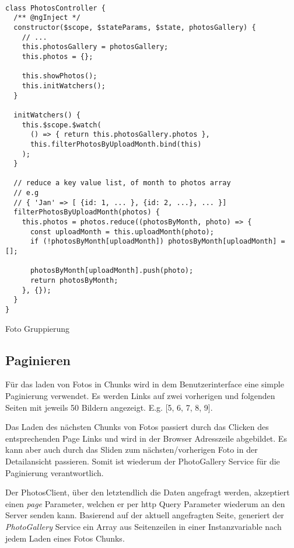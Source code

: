 \begin{listing}[H]
\begin{verbatim}

class PhotosController {
  /** @ngInject */
  constructor($scope, $stateParams, $state, photosGallery) {
    // ...
    this.photosGallery = photosGallery;
    this.photos = {};

    this.showPhotos();
    this.initWatchers();
  }

  initWatchers() {
    this.$scope.$watch(
      () => { return this.photosGallery.photos }, 
      this.filterPhotosByUploadMonth.bind(this)
    );
  }

  // reduce a key value list, of month to photos array
  // e.g
  // { 'Jan' => [ {id: 1, ... }, {id: 2, ...}, ... }]
  filterPhotosByUploadMonth(photos) {
    this.photos = photos.reduce((photosByMonth, photo) => {
      const uploadMonth = this.uploadMonth(photo);
      if (!photosByMonth[uploadMonth]) photosByMonth[uploadMonth] = [];

      photosByMonth[uploadMonth].push(photo);
      return photosByMonth;
    }, {});
  }
}

\end{verbatim}
\caption{Foto Gruppierung}
\label{lst:photo_group}
\end{listing} 

\subsection{Paginieren}

Für das laden von Fotos in Chunks wird in dem Benutzerinterface eine simple Paginierung verwendet. Es werden Links auf zwei vorherigen und folgenden Seiten mit jeweils 50 Bildern angezeigt. E.g. [5, 6, 7, 8, 9]. 

Das Laden des nächsten Chunks von Fotos passiert durch das Clicken des entsprechenden Page Links und wird in der Browser Adresszeile abgebildet. Es kann aber auch durch das Sliden zum nächsten/vorherigen Foto in der Detailansicht passieren. Somit ist wiederum der PhotoGallery Service für die Paginierung verantwortlich.

Der PhotosClient, über den letztendlich die Daten angefragt werden, akzeptiert einen \textit{page} Parameter, welchen er per http Query Parameter wiederum an den Server senden kann. Basierend auf der aktuell angefragten Seite, generiert der \textit{PhotoGallery} Service ein Array aus Seitenzeilen in einer Instanzvariable nach jedem Laden eines Fotos Chunks. 

